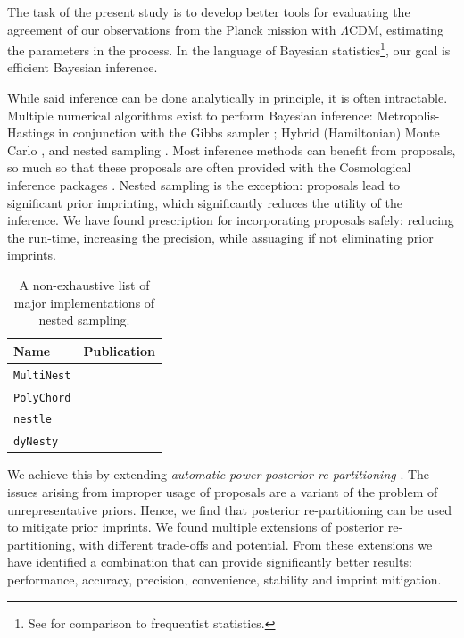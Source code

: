 \documentclass[usenatbib]{mnras}
\begin{document}
The task of the present study is to develop better tools for
evaluating the agreement of our observations from the Planck mission
with \(\Lambda\)CDM, estimating the parameters in the process. In the
language of Bayesian statistics\footnote{See \cite{xkcd} for
  comparison to frequentist statistics.}, our goal is efficient
Bayesian inference. 

While said inference can be done analytically in principle, it is
often intractable. Multiple numerical algorithms exist to perform
Bayesian inference: Metropolis-Hastings \citep{Metropolis} in
conjunction with the Gibbs sampler \citep{Metropolis-Hastings-Gibbs};
Hybrid (Hamiltonian) Monte Carlo \citep{1701.02434,Duane_1987}, and
nested sampling \citep{Skilling2006}. Most inference methods can
benefit from proposals, so much so that these proposals are often
provided with the Cosmological inference packages
\citep{cobaya}. Nested sampling is the exception: proposals lead to
significant prior imprinting, which significantly reduces the utility
of the inference. We have found prescription for incorporating
proposals safely: reducing the run-time, increasing the precision,
while assuaging if not eliminating prior imprints.

\begin{table}
  \centering
  \caption{A non-exhaustive list of major implementations of nested sampling.}
  \begin{tabular}{lr}
    \textbf{Name} & \textbf{Publication}\\
    \hline
    \texttt{MultiNest} & \cite{Feroz2009MultiNestAE} \\
    \texttt{PolyChord} & \cite{polychord} \\
    \texttt{nestle} & \cite{nestle} \\
    \texttt{dyNesty} & \cite{Speagle_2020}
  \end{tabular}

\end{table}

We achieve this by extending \emph{automatic power posterior
  re-partitioning} \citep{chen-ferroz-hobson}. The issues arising from
improper usage of proposals are a variant of the problem of
unrepresentative priors. Hence, we find that posterior re-partitioning
can be used to mitigate prior imprints. We found multiple extensions
of posterior re-partitioning, with different trade-offs and potential.
From these extensions we have identified a combination that can
provide significantly better results: performance, accuracy,
precision, convenience, stability and imprint mitigation.
\end{document}
